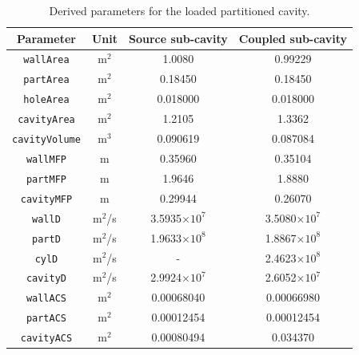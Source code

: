 \documentclass[a4paper]{article}
\numberwithin{equation}{section}
\begin{document}
\begin{table}[H]
\begin{center}
\begin{tabular}{|c|c|c|c|}
\hline
\textbf{Parameter}     &\textbf{Unit} &\textbf{Source sub-cavity} &\textbf{Coupled sub-cavity}\\ 
\hline
\texttt{wallArea}      &m$^2$         &1.0080                     &0.99229             \\
\texttt{partArea}      &m$^2$         &0.18450                    &0.18450             \\
\texttt{holeArea}      &m$^2$         &0.018000                   &0.018000            \\
\texttt{cavityArea}    &m$^2$         &1.2105                     &1.3362              \\
\texttt{cavityVolume}  &m$^3$         &0.090619                   &0.087084            \\
\texttt{wallMFP}       &m             &0.35960                    &0.35104             \\
\texttt{partMFP}       &m             &1.9646                     &1.8880              \\
\texttt{cavityMFP}     &m             &0.29944                    &0.26070             \\
\texttt{wallD}         &m$^2$/s       &3.5935$\times 10^7$        &3.5080$\times 10^7$ \\
\texttt{partD}         &m$^2$/s       &1.9633$\times 10^8$        &1.8867$\times 10^8$ \\
\texttt{cylD}          &m$^2$/s       &-                          &2.4623$\times 10^8$ \\
\texttt{cavityD}       &m$^2$/s       &2.9924$\times 10^7$        &2.6052$\times 10^7$ \\
\texttt{wallACS}       &m$^2$         &0.00068040                 &0.00066980          \\
\texttt{partACS}       &m$^2$         &0.00012454                 &0.00012454          \\
\texttt{cavityACS}     &m$^2$         &0.00080494                 &0.034370            \\
\hline
\end{tabular}
\end{center}
\caption{\label{tb:derivparamdl} Derived parameters for the loaded partitioned cavity.}
\end{table}
\end{document}
